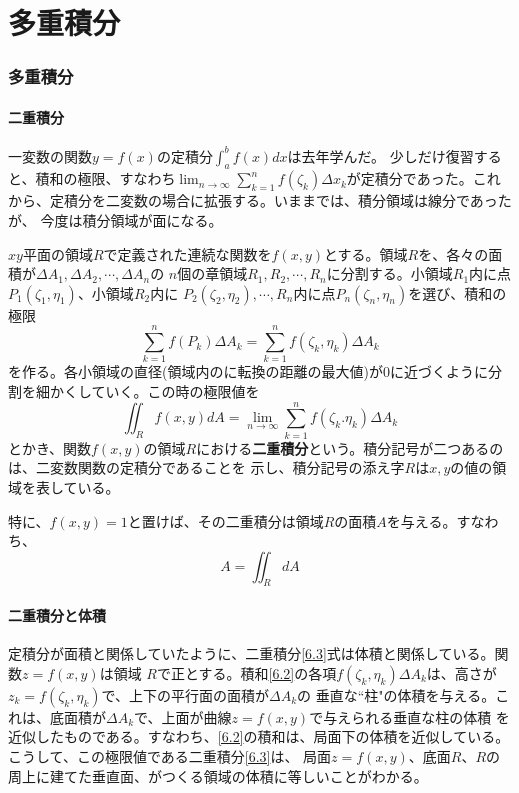 \documentclass[a4j,dvipdfmx]{jsarticle}
\begin{document}
\part*{多重積分}
\section{多重積分}
\subsection{二重積分}
一変数の関数$y=f(x)$の定積分$\displaystyle \int_a^b f(x)dx$は去年学んだ。
少しだけ復習すると、積和の極限、すなわち$\displaystyle \lim_{n\to\infty}\sum_{k=1}^{n}f(\zeta_k)\Delta x_k$が定積分であった。これから、定積分を二変数の場合に拡張する。いままでは、積分領域は線分であったが、
今度は積分領域が面になる。

$xy$平面の領域$R$で定義された連続な関数を$f(x,y)$とする。領域$R$を、各々の面積が$\Delta A_1,\Delta A_2,\cdots,\Delta A_n$の
$n$個の章領域$R_1,R_2,\cdots,R_n$に分割する。小領域$R_1$内に点$P_1(\zeta_1,\eta_1)$、小領域$R_2$内に
$P_2(\zeta_2,\eta_2),\cdots,R_n$内に点$P_n(\zeta_n,\eta_n)$を選び、積和の極限
\begin{equation}
    \sum_{k=1}^{n}f(P_k)\Delta A_k=\sum_{k=1}^{n}f(\zeta_k,\eta_k)\Delta A_k\label{6.2}
\end{equation}
を作る。各小領域の直径(領域内のに転換の距離の最大値)が0に近づくように分割を細かくしていく。この時の極限値を
\begin{equation}
    \iint_R f(x,y)dA=\lim_{n\to\infty}\sum_{k=1}^{n}f(\zeta_k.\eta_k)\Delta A_k\label{6.3}
\end{equation}
とかき、関数$f(x,y)$の領域$R$における\textbf{二重積分}という。積分記号が二つあるのは、二変数関数の定積分であることを
示し、積分記号の添え字$R$は$x,y$の値の領域を表している。

特に、$f(x,y)=1$と置けば、その二重積分は領域$R$の面積$A$を与える。すなわち、
\begin{equation}
    A=\iint_RdA\label{6.4}
\end{equation}
\subsection{二重積分と体積}
定積分が面積と関係していたように、二重積分\eqref{6.3}式は体積と関係している。関数$z=f(x,y)$は領域
$R$で正とする。積和\eqref{6.2}の各項$f(\zeta_k,\eta_k)\Delta A_k$は、高さが$z_k=f(\zeta_k,\eta_k)$で、上下の平行面の面積が$\Delta A_k$の
垂直な``柱"の体積を与える。これは、底面積が$\Delta A_k$で、上面が曲線$z=f(x,y)$で与えられる垂直な柱の体積
を近似したものである。すなわち、\eqref{6.2}の積和は、局面下の体積を近似している。こうして、この極限値である二重積分\eqref{6.3}は、
局面$z=f(x,y)$、底面$R$、$R$の周上に建てた垂直面、がつくる領域の体積に等しいことがわかる。
\end{document}
